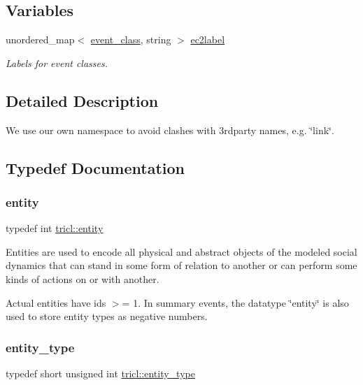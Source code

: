 \subsection*{Variables}
\begin{DoxyCompactItemize}
\item 
unordered\+\_\+map$<$ \hyperlink{namespacetricl_a6967089e2c0837f273d8cb5fd9f7e46d}{event\+\_\+class}, string $>$ \hyperlink{namespacetricl_a321f250312d2a16a422999a72fc8eb4e}{ec2label}
\begin{DoxyCompactList}\small\item\em Labels for event classes. \end{DoxyCompactList}\end{DoxyCompactItemize}


\subsection{Detailed Description}
We use our own namespace to avoid clashes with 3rdparty names, e.\+g. \char`\"{}link\char`\"{}. 

\subsection{Typedef Documentation}
\mbox{\label{namespacetricl_a57273122278e8b301844e2a2e1f0742f}} 
\subsubsection{\texorpdfstring{entity}{entity}}
{\footnotesize\ttfamily typedef int \hyperlink{namespacetricl_a57273122278e8b301844e2a2e1f0742f}{tricl\+::entity}}



Entities are used to encode all physical and abstract objects of the modeled social dynamics that can stand in some form of relation to another or can perform some kinds of actions on or with another. 

Actual entities have ids $>$= 1. In summary events, the datatype \char`\"{}entity\char`\"{} is also used to store entity types as negative numbers. \mbox{\label{namespacetricl_afd4de3aedd5e48cf955f03457386e98f}} 
\subsubsection{\texorpdfstring{entity\+\_\+type}{entity\_type}}
{\footnotesize\ttfamily typedef short unsigned int \hyperlink{namespacetricl_afd4de3aedd5e48cf955f03457386e98f}{tricl\+::entity\+\_\+type}}



